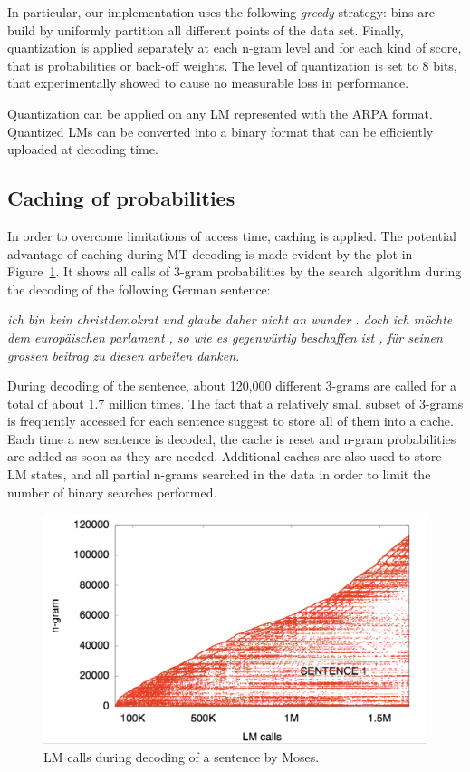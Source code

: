 \documentclass[11pt]{report}
\theoremstyle{plain}
\begin{document}
{In particular, our implementation uses the following {\em greedy} strategy: bins are
build by uniformly partition all different points of the data set.  Finally, quantization is 
applied separately at each n-gram level and for each kind of score, that is probabilities
or back-off weights.  The level of quantization is set to 8 bits, that experimentally showed 
to cause  no measurable loss in performance.

Quantization can be applied on any LM represented with the ARPA format. Quantized LMs
can be converted into a binary format that can be efficiently uploaded at decoding time.


\subsection{Caching of probabilities}

In order to overcome limitations of access time, caching is applied. The potential advantage
of caching during MT decoding is made evident by the plot in Figure~\ref{fig:LM-calls}. 
It shows all calls of 3-gram probabilities by the search algorithm during the decoding of
the following German sentence:

{\em ich bin kein christdemokrat und glaube daher nicht an wunder . doch ich m\"ochte dem europ\"aischen parlament , so wie es gegenw\"urtig beschaffen ist , f\"ur seinen grossen beitrag zu diesen arbeiten danken.}

During decoding of the sentence, about 120,000 different 3-grams are called for a total 
of about  1.7 million times.  The fact that a relatively small subset of 3-grams is frequently
accessed for each sentence suggest to store all of them into a cache. Each time a new 
sentence is decoded, the cache is reset and n-gram probabilities are added as soon as they are 
needed.  Additional caches are also used to store LM states, and all partial  n-grams 
searched in the data in order to limit the number of binary searches performed.

\begin{figure}
\begin{center}
 \includegraphics[width=\columnwidth]{marcello-lmcalls}
\caption{LM calls during decoding of a sentence by Moses.}
\label{fig:LM-calls}
\end{center}
 \end{figure}

}
\end{document}

